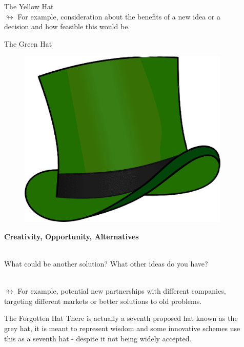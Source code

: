 \documentclass[final]{beamer}
\newlength{\sepwidth}
\newlength{\colwidth}
\newcommand{\separatorcolumn}{\begin{column}{\sepwidth}\end{column}}
\begin{document}
\begin{frame}{}
\begin{columns}[t]
\begin{column}{\colwidth}
\begin{myblock}{The Yellow Hat}
    \\ $\looparrowright$ For example, consideration about the benefits of a new idea or a decision and how feasible this would be.

    \end{myblock}

    \begin{myblock}{The Green Hat} 
    \begin{figure}
        \includegraphics[height=0.4\textwidth]{Images/green_tr.png}
    \end{figure}
    \textbf{Creativity, Opportunity, Alternatives}

    \\ What could be another solution?
    What other ideas do you have?

    \\ $\looparrowright$ For example, potential new partnerships with different companies, targeting different markets or better solutions to old problems.
    \end{myblock}

    \begin{myblock}{The Forgotten Hat} 
    There is actually a seventh proposed hat known as the grey hat, it is meant to represent wisdom and some innovative schemes use this as a seventh hat - despite it not being widely accepted.
    \end{myblock}
    
\end{column}
\separatorcolumn
\begin{column}{\colwidth}
    \vspace{-2cm}


\end{column}
\end{columns}
\end{frame}
\end{document}
